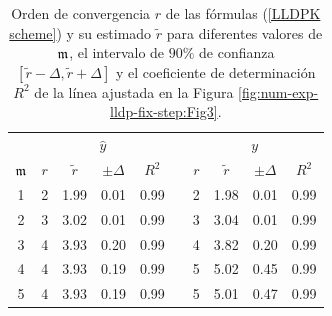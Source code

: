 \begin{table}[htb]
	\centering
	\caption{
		Orden de convergencia $r$ de las fórmulas (\ref{LLDPK scheme}) y su estimado  $\widetilde{r}$ para diferentes valores de $\mathfrak{m}$, el intervalo de $90\%$ de confianza $[\widetilde{r}-\varDelta,\widetilde{r}+\varDelta]$ y el coeficiente de determinación $R^2$ de la línea ajustada en la Figura \ref{fig:num-exp-lldp-fix-step:Fig3}.}
	\begin{tabular}{ c  c c c c  c  c c c c}
		\hline
		& \multicolumn{4}{c}{$\widehat{y}$} & & \multicolumn{4}{c}{$y$} \\
		\cline{2-5} \cline{7-10}
		$\mathfrak{m}$ & $r$ & $\widetilde{r}$ & $\pm\varDelta$ & $R^2$ & & $r$ & $\widetilde{r}$ & $\pm\varDelta$ & $R^2$ \\
		\hline
		1 & 2 & 1.99 & 0.01 & 0.99 & & 2 & 1.98 & 0.01 & 0.99 \\
		2 & 3 & 3.02 & 0.01 & 0.99 & & 3 & 3.04 & 0.01 & 0.99 \\
		3 & 4 & 3.93 & 0.20 & 0.99 & & 4 & 3.82 & 0.20 & 0.99 \\
		4 & 4 & 3.93 & 0.19 & 0.99 & & 5 & 5.02 & 0.45 & 0.99 \\
		5 & 4 & 3.93 & 0.19 & 0.99 & & 5 & 5.01 & 0.47 & 0.99 \\
		\hline
	\end{tabular}
	\label{tab:num-exp-lldp-fix-step:morders}
\end{table}


